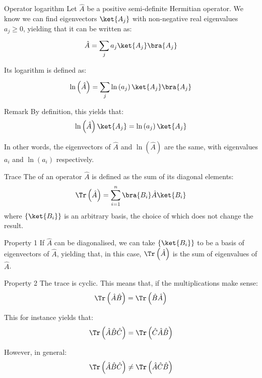 \documentclass[a4paper]{article}
\begin{document}
\begin{parag}{Operator logarithm}
    Let $\hat{A}$ be a positive semi-definite Hermitian operator. We know we can find eigenvectors $\ket{A_j}$ with non-negative real eigenvalues $a_j \geq 0$, yielding that it can be written as: 
    \[\hat{A} = \sum_{j}^{} a_j \ket{A_j} \bra{A_j}\]
    
    Its logarithm is defined as: 
    \[\ln\left(\hat{A}\right) = \sum_{j}^{} \ln\left(a_j\right) \ket{A_j} \bra{A_j}\]
    
    \begin{subparag}{Remark}
        By definition, this yields that: 
        \[\ln\left(\hat{A}\right) \ket{A_j} = \ln\left(a_j\right) \ket{A_j}\]

        In other words, the eigenvectors of $\hat{A}$ and $\ln\left(\hat{A}\right)$ are the same, with eigenvalues $a_i$ and $\ln\left(a_i\right)$ respectively.
    \end{subparag}
\end{parag}

\begin{parag}{Trace}
    The  of an operator $\hat{A}$ is defined as the sum of its diagonal elements: 
    \[\Tr\left(\hat{A}\right) = \sum_{i=1}^{n} \bra{B_i} \hat{A} \ket{B_i}\]
    where $\left\{\ket{B_i}\right\}$ is an arbitrary basis, the choice of which does not change the result.

    \begin{subparag}{Property 1}
        If $\hat{A}$ can be diagonalised, we can take $\left\{\ket{B_i}\right\}$ to be a basis of eigenvectors of $\hat{A}$, yielding that, in this case, $\Tr\left(\hat{A}\right)$ is the sum of eigenvalues of $\hat{A}$.
    \end{subparag}

    \begin{subparag}{Property 2}
        The trace is cyclic. This means that, if the multiplications make sense: 
        \[\Tr\left(\hat{A}\hat{B}\right) = \Tr\left(\hat{B}\hat{A}\right)\]
        
        This for instance yields that: 
        \[\Tr\left(\hat{A} \hat{B} \hat{C}\right) = \Tr\left(\hat{C} \hat{A} \hat{B}\right)\]

        However, in general: 
        \[\Tr\left(\hat{A} \hat{B} \hat{C}\right) \neq \Tr\left(\hat{A} \hat{C} \hat{B}\right)\]
    \end{subparag}
\end{parag}
\end{document}
